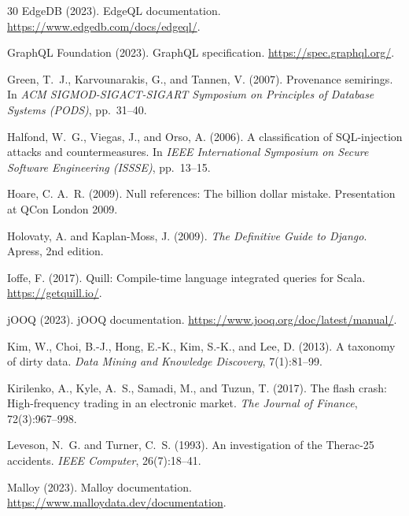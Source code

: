 \documentclass[11pt,a4paper]{article}
\begin{document}
\begin{thebibliography}{30}
EdgeDB (2023).
\newblock EdgeQL documentation.
\newblock \url{https://www.edgedb.com/docs/edgeql/}.

GraphQL Foundation (2023).
\newblock GraphQL specification.
\newblock \url{https://spec.graphql.org/}.

Green, T.~J., Karvounarakis, G., and Tannen, V. (2007).
\newblock Provenance semirings.
\newblock In \emph{ACM SIGMOD-SIGACT-SIGART Symposium on Principles of Database
  Systems (PODS)}, pp.~31--40.

Halfond, W.~G., Viegas, J., and Orso, A. (2006).
\newblock A classification of {SQL}-injection attacks and countermeasures.
\newblock In \emph{IEEE International Symposium on Secure Software Engineering
  (ISSSE)}, pp.~13--15.

Hoare, C. A.~R. (2009).
\newblock Null references: The billion dollar mistake.
\newblock Presentation at QCon London 2009.

Holovaty, A. and Kaplan-Moss, J. (2009).
\newblock \emph{The Definitive Guide to Django}.
\newblock Apress, 2nd edition.

Ioffe, F. (2017).
\newblock Quill: Compile-time language integrated queries for Scala.
\newblock \url{https://getquill.io/}.

jOOQ (2023).
\newblock jOOQ documentation.
\newblock \url{https://www.jooq.org/doc/latest/manual/}.

Kim, W., Choi, B.-J., Hong, E.-K., Kim, S.-K., and Lee, D. (2013).
\newblock A taxonomy of dirty data.
\newblock \emph{Data Mining and Knowledge Discovery}, 7(1):81--99.

Kirilenko, A., Kyle, A.~S., Samadi, M., and Tuzun, T. (2017).
\newblock The flash crash: High-frequency trading in an electronic market.
\newblock \emph{The Journal of Finance}, 72(3):967--998.

Leveson, N.~G. and Turner, C.~S. (1993).
\newblock An investigation of the {Therac-25} accidents.
\newblock \emph{IEEE Computer}, 26(7):18--41.

Malloy (2023).
\newblock Malloy documentation.
\newblock \url{https://www.malloydata.dev/documentation}.


\end{thebibliography}
\end{document}
